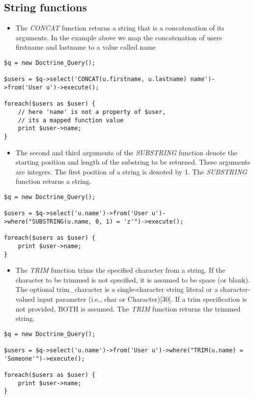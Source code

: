 \documentclass[11pt,a4paper]{report}
\begin{document}
\subsection{String functions}
\begin{itemize}
\item{The \textsl{CONCAT} function returns a string that is a concatenation of its arguments. In the example above we map the concatenation of users firstname and lastname to a value called name}
\end{itemize}
\begin{verbatim}
$q = new Doctrine_Query();

$users = $q->select('CONCAT(u.firstname, u.lastname) name')->from('User u')->execute();

foreach($users as $user) {
    // here 'name' is not a property of $user,
    // its a mapped function value
    print $user->name;
}
\end{verbatim}

\begin{itemize}
\item{The second and third arguments of the \textsl{SUBSTRING} function denote the starting position and length of the substring to be returned. These arguments are integers. The first position of a string is denoted by 1. The \textsl{SUBSTRING} function returns a string.}
\end{itemize}
\begin{verbatim}
$q = new Doctrine_Query();

$users = $q->select('u.name')->from('User u')->where("SUBSTRING(u.name, 0, 1) = 'z'")->execute();

foreach($users as $user) {
    print $user->name;
}
\end{verbatim}

\begin{itemize}
\item{The \textsl{TRIM} function trims the specified character from a string. If the character to be trimmed is not specified, it is assumed to be space (or blank). The optional trim\_character is a single-character string literal or a character-valued input parameter (i.e., char or Character)[30]. If a trim specification is not provided, BOTH is assumed. The \textsl{TRIM} function returns the trimmed string.}
\end{itemize}
\begin{verbatim}
$q = new Doctrine_Query();

$users = $q->select('u.name')->from('User u')->where("TRIM(u.name) = 'Someone'")->execute();

foreach($users as $user) {
    print $user->name;
}
\end{verbatim}
\end{document}
